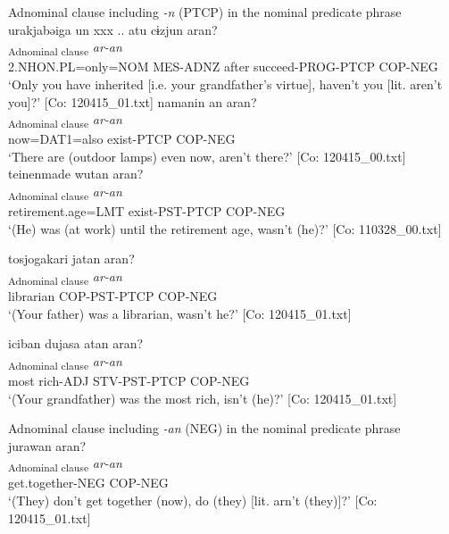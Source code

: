 \ea   
\exi{} Adnominal clause including \textit{-n} (PTCP) in the nominal predicate phrase \label{ex:9.57}
\ea %
 \glll  urakjabəiga  un  xxx ..  atu   cɨzjun  aran?\\
      [\textit{urakja=bəi=ga}  \textit{u-n}    \textit{atu}  \textit{cɨg-tur-n}]\textsubscript{Adnominal clause}  \textit{ar-an}\\
      2.NHON.PL=only=NOM  MES-ADNZ    after  succeed-PROG-PTCP  COP-NEG\\
      \glt       ‘Only you have inherited [i.e. your grandfather’s virtue], haven’t you [lit. aren’t you]?’ [Co: 120415\_01.txt]
  \ex{}%
    \glll  namanin  an  aran?\\
      [\textit{nama=n=n}  \textit{ar-n}]\textsubscript{Adnominal clause}  \textit{ar-an}\\
      now=DAT1=also  exist-PTCP  COP-NEG\\
      \glt       ‘There are (outdoor lamps) even now, aren’t there?’ [Co: 120415\_00.txt]
\ex \label{ex:9.57c} %
    \glll  {\textbar}teinenmade{\textbar}  wutan  aran?\\
      [\textit{teinen=made}  \textit{wur-tar-n}]\textsubscript{Adnominal clause}\textbf{  }\textit{ar-an}\\
      retirement.age=LMT  exist-PST-PTCP  COP-NEG\\
      \glt       ‘(He) was (at work) until the retirement age, wasn’t (he)?’ [Co: 110328\_00.txt]

\ex \label{ex:9.57d} %
 \glll  {\textbar}tosjogakari{\textbar}  jatan  aran?\\
      [\textit{tasjogakari}  \textit{jar-tar-n}]\textsubscript{Adnominal clause}  \textit{ar-an}\\
      librarian  COP-PST-PTCP  COP-NEG\\
      \glt       ‘(Your father) was a librarian, wasn’t he?’ [Co: 120415\_01.txt]

\ex \label{ex:9.57e} %
 \glll  {\textbar}iciban{\textbar}  dujasa  atan  aran?\\
      [\textit{iciban}  \textit{duja-sa}  \textit{ar-tar-n}]\textsubscript{Adnominal clause}  \textit{ar-an}\\
      most  rich-ADJ  STV-PST-PTCP  COP-NEG\\
      \glt       ‘(Your grandfather) was the most rich, isn’t (he)?’ [Co: 120415\_01.txt]

\exi{}  Adnominal clause including \textit{-an} (NEG) in the nominal predicate phrase
\ex{}\\
    \glll  jurawan  aran?\\
      [\textit{juraw-an}]\textsubscript{Adnominal clause}  \textit{ar-an}\\
      get.together-NEG  COP-NEG\\
      \glt       ‘(They) don’t get together (now), do (they) [lit. arn’t (they)]?’ [Co: 120415\_01.txt]

